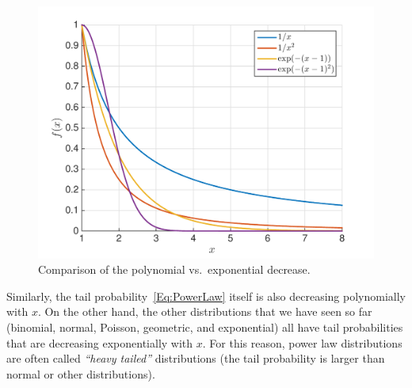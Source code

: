 \documentclass[11pt]{article}
\begin{document}
\begin{figure}[h!]
\centering
\includegraphics[scale=0.4]{tails}
\caption{Comparison of the polynomial vs.\ exponential decrease.}
\label{fig:tails}
\end{figure}

Similarly, the tail probability~\eqref{Eq:PowerLaw} itself is also decreasing polynomially with $x$. On the other hand, the other distributions that we have seen so far (binomial, normal, Poisson, geometric, and exponential) all have tail probabilities that are decreasing exponentially with $x$. For this reason, power law distributions are often called {\em ``heavy tailed''} distributions (the tail probability is larger than normal or other distributions).
\end{document}

